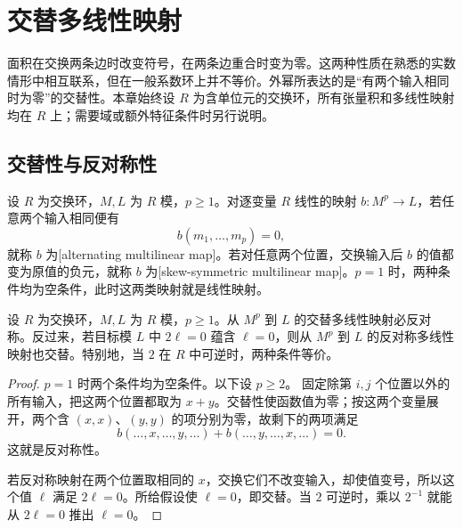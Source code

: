 
\section{交替多线性映射}
\label{b2:sec:0901}

面积在交换两条边时改变符号，在两条边重合时变为零。这两种性质在熟悉的实数情形中相互联系，但在一般系数环上并不等价。外幂所表达的是“有两个输入相同时为零”的交替性。本章始终设 \(R\) 为含单位元的交换环，所有张量积和多线性映射均在 \(R\) 上；需要域或额外特征条件时另行说明。

%
%

\subsection{交替性与反对称性}
\label{b2:subsec:0901:01}

\begin{definition}\label{b2:def:alternating-multilinear}
	设 \(R\) 为交换环，\(M,L\) 为 \(R\) 模，\(p\ge1\)。对逐变量 \(R\) 线性的映射 \(b:M^p\to L\)，若任意两个输入相同便有
	\[
		b(m_1,\ldots,m_p)=0,
	\]
	就称 \(b\) 为[alternating multilinear map]。若对任意两个位置，交换输入后 \(b\) 的值都变为原值的负元，就称 \(b\) 为[skew-symmetric multilinear map]。\(p=1\) 时，两种条件均为空条件，此时这两类映射就是线性映射。
\end{definition}

\begin{proposition}\label{b2:prop:alternating-implies-skew}
	设 \(R\) 为交换环，\(M,L\) 为 \(R\) 模，\(p\ge1\)。从 \(M^p\) 到 \(L\) 的交替多线性映射必反对称。反过来，若目标模 \(L\) 中 \(2\ell=0\) 蕴含 \(\ell=0\)，则从 \(M^p\) 到 \(L\) 的反对称多线性映射也交替。特别地，当 \(2\) 在 \(R\) 中可逆时，两种条件等价。
\end{proposition}
\begin{proof}
	\(p=1\) 时两个条件均为空条件。以下设 \(p\ge2\)。 固定除第 \(i,j\) 个位置以外的所有输入，把这两个位置都取为 \(x+y\)。交替性使函数值为零；按这两个变量展开，两个含 \((x,x)\)、\((y,y)\) 的项分别为零，故剩下的两项满足
	\[
		b(\ldots,x,\ldots,y,\ldots) +b(\ldots,y,\ldots,x,\ldots)=0.
	\]
	这就是反对称性。

	若反对称映射在两个位置取相同的 \(x\)，交换它们不改变输入，却使值变号，所以这个值 \(\ell\) 满足 \(2\ell=0\)。所给假设使 \(\ell=0\)，即交替。当 \(2\) 可逆时，乘以 \(2^{-1}\) 就能从 \(2\ell=0\) 推出 \(\ell=0\)。
\end{proof}

